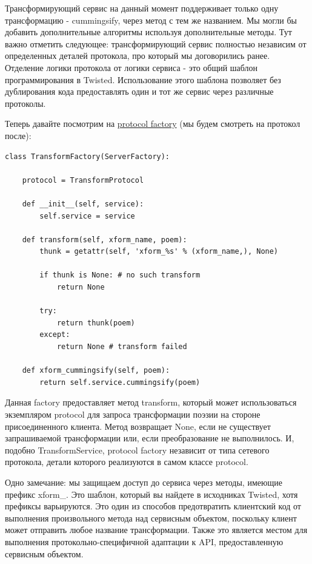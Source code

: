 Трансформирующий сервис на данный момент поддерживает 
только одну трансформацию - cummingsify, через метод 
с тем же названием. Мы могли бы добавить дополнительные алгоритмы 
используя дополнительные методы. Тут важно отметить следующее: 
трансформирующий сервис полностью независим от определенных 
деталей протокола, про который мы договорились ранее. Отделение логики 
протокола от логики сервиса - это общий шаблон программирования  
в Twisted. Использование этого шаблона позволяет без дублирования кода 
предоставлять один и тот же сервис через различные протоколы.


Теперь давайте посмотрим на 
\href{http://github.com/jdavisp3/twisted-intro/blob/master/twisted-server-1/tranformedpoetry.py#L67}{protocol factory} (мы будем смотреть на протокол после):

\begin{scriptsize}\begin{verbatim}
class TransformFactory(ServerFactory):

    protocol = TransformProtocol

    def __init__(self, service):
        self.service = service

    def transform(self, xform_name, poem):
        thunk = getattr(self, 'xform_%s' % (xform_name,), None)

        if thunk is None: # no such transform
            return None

        try:
            return thunk(poem)
        except:
            return None # transform failed

    def xform_cummingsify(self, poem):
        return self.service.cummingsify(poem)
\end{verbatim}\end{scriptsize}


Данная factory предоставляет метод transform, который 
может использоваться экземпляром protocol для запроса 
трансформации поэзии на стороне присоединенного клиента. 
Метод возвращает None, если не существует запрашиваемой 
трансформации или, если преобразование не выполнилось. И, 
подобно TransformService, protocol factory независит от 
типа сетевого протокола, детали которого реализуются в самом 
классе protocol. 


Одно замечание: мы защищаем доступ до сервиса через 
методы, имеющие префикс xform\_. Это шаблон, который 
вы найдете в исходниках Twisted, хотя префиксы 
варьируются. Это один из способов предотвратить 
клиентский код от выполнения произвольного метода 
над сервисным объектом, поскольку клиент может отправить 
любое название трансформации. Также это является 
местом для выполнения протокольно-специфичной адаптации к 
API, предоставленную сервисным объектом. 


